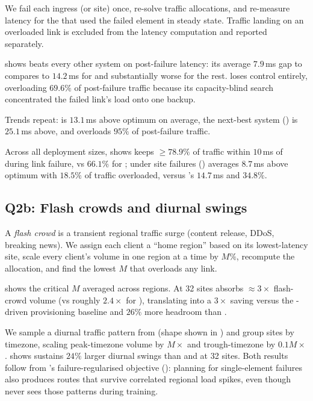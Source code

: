 \documentclass[acmsmall,anonymous,review,nonacm,10pt]{acmart}
\begin{document}
We fail each ingress (or site) once, re-solve traffic
allocations, and re-measure latency for the \ugs that used the
failed element in steady state.  Traffic landing on an overloaded
link is excluded from the latency computation and reported
separately.

 shows \sparse
beats every other system on post-failure latency: its average
$7.9$\,ms gap to \expensive compares to $14.2$\,ms for \ucast
and substantially worse for the rest.  \painter loses control
entirely, overloading $69.6\%$ of post-failure traffic because
its capacity-blind search concentrated the failed link's load
onto one backup.

  Trends repeat: \sparse
is $13.1$\,ms above optimum on average, the next-best system
(\ucast) is $25.1$\,ms above, and \painter overloads $95\%$ of
post-failure traffic.

  Across all deployment sizes,
 shows \sparse keeps
$\geq 78.9\%$ of traffic within $10$\,ms of \expensive during
link failure, vs $66.1\%$ for \painter; under site failures
()
\sparse averages $8.7$\,ms above optimum with $18.5\%$ of traffic
overloaded, versus \painter's $14.7$\,ms and $34.8\%$.

\subsection{Q2b: Flash crowds and diurnal swings}
\label{sec:eval-efficiency}

A \emph{flash crowd} is a transient regional traffic surge
(content release, DDoS, breaking news).  We assign each client a
``home region'' based on its lowest-latency site, scale every
client's volume in one region at a time by $M\%$, recompute the
allocation, and find the lowest $M$ that overloads any link.

 shows the
critical $M$ averaged across regions.  At 32 sites \sparse
absorbs $\approx 3\times$ flash-crowd volume (vs roughly
$2.4\times$ for \painter), translating into a $3\times$ saving
versus the \acast-driven provisioning baseline and $26\%$ more
headroom than \painter.

We sample a diurnal traffic pattern from
\cite{taiji} (shape shown in ) and
group sites by timezone, scaling peak-timezone
volume by $M\times$ and trough-timezone by $0.1M\times$.
 shows \sparse
sustains $24\%$ larger diurnal swings than \painter and
\ucast at 32 sites.  Both results follow from \sparse's
failure-regularised objective
(): planning for single-element failures
also produces routes that survive correlated regional load
spikes, even though \sparse never sees those patterns during
training.
\end{document}
